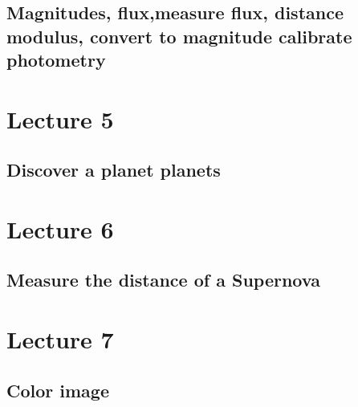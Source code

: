 \documentclass[11pt]{book}
\begin{document}
\section{Magnitudes, flux,measure flux,  distance modulus, convert to magnitude calibrate photometry}


\chapter{Lecture 5}
\section{Discover a planet planets}

\chapter{Lecture 6}
\section{Measure the distance of a Supernova}

\chapter{Lecture 7}
\section{Color image}








\end{document}
